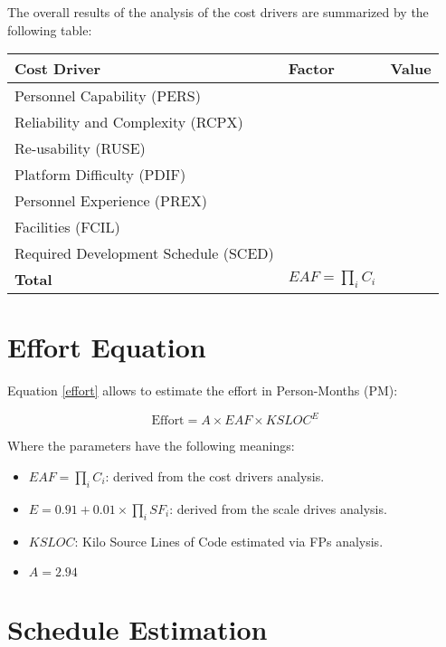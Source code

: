 \noindent
The overall results of the analysis of the cost drivers are summarized by the following table:

\begin{table}[H]
    \centering
    \begin{tabular}{l|l|l}
    	\hline
    	Cost Driver & Factor & Value \\
        \hline
        \hline
        Personnel Capability (PERS) & & \\
        \hline
        Reliability and Complexity (RCPX) & & \\
        \hline
        Re-usability (RUSE) & & \\
        \hline
        Platform Difficulty (PDIF) & & \\
        \hline
        Personnel Experience (PREX) & & \\
        \hline
        Facilities (FCIL) & & \\
        \hline
        Required Development Schedule (SCED) & & \\
        \hline
        \textbf{Total}  & $EAF=\prod_i C_i$ & \\
        \hline
    \end{tabular}
\end{table}

\section{Effort Equation}
Equation \ref{effort} allows to estimate the effort in Person-Months (PM):

\begin{equation}
    \textrm{Effort} = A \times EAF \times KSLOC^E
    \label{effort}
\end{equation}

Where the parameters have the following meanings:
\begin{itemize}
    \item $EAF = \prod_i C_i$: derived from the cost drivers analysis.
    \item $E=0.91 + 0.01 \times \prod_{i}SF_i$: derived from the scale drives analysis.
    \item $KSLOC$: Kilo Source Lines of Code estimated via FPs analysis.
    \item $A=2.94$
\end{itemize}

\section{Schedule Estimation}